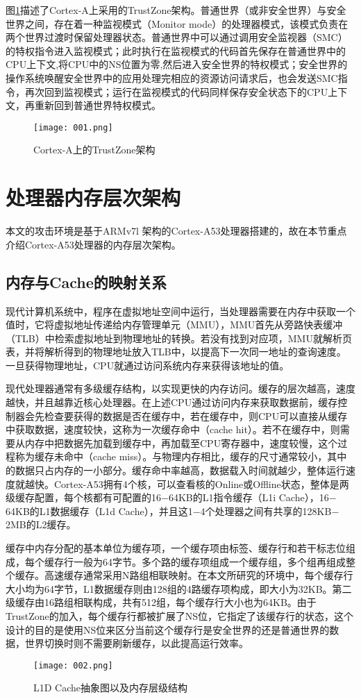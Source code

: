 图\ref{001}描述了Cortex-A上采用的TrustZone架构。普通世界（或非安全世界）与安全世界之间，存在着一种监视模式（Monitor  mode）的处理器模式，该模式负责在两个世界过渡时保留处理器状态。普通世界中可以通过调用安全监视器（SMC）的特权指令进入监视模式；此时执行在监视模式的代码首先保存在普通世界中的CPU上下文,将CPU中的NS位置为零,然后进入安全世界的特权模式；安全世界的操作系统唤醒安全世界中的应用处理完相应的资源访问请求后，也会发送SMC指令，再次回到监视模式；运行在监视模式的代码同样保存安全状态下的CPU上下文，再重新回到普通世界特权模式。

\begin{figure}[H]
	\centering
	\texttt{[image: 001.png]}
	\caption{Cortex-A上的TrustZone架构}
	\label{001}
\end{figure}

\section{处理器内存层次架构}
本文的攻击环境是基于ARMv7l 架构的Cortex-A53处理器搭建的，故在本节重点介绍Cortex-A53处理器的内存层次架构。
\subsection{内存与Cache的映射关系}
现代计算机系统中，程序在虚拟地址空间中运行，当处理器需要在内存中获取一个值时，它将虚拟地址传递给内存管理单元（MMU），MMU首先从旁路快表缓冲（TLB）中检索虚拟地址到物理地址的转换。若没有找到对应项，MMU就解析页表，并将解析得到的物理地址放入TLB中，以提高下一次同一地址的查询速度。一旦获得物理地址，CPU就通过访问系统内存来获得该地址的值。

现代处理器通常有多级缓存结构，以实现更快的内存访问。缓存的层次越高，速度越快，并且越靠近核心处理器。在上述CPU通过访问内存来获取数据前，缓存控制器会先检查要获得的数据是否在缓存中，若在缓存中，则CPU可以直接从缓存中获取数据，速度较快，这称为一次缓存命中（cache hit）。若不在缓存中，则需要从内存中把数据先加载到缓存中，再加载至CPU寄存器中，速度较慢，这个过程称为缓存未命中（cache miss）。与物理内存相比，缓存的尺寸通常较小，其中的数据只占内存的一小部分。缓存命中率越高，数据载入时间就越少，整体运行速度就越快。Cortex-A53拥有4个核，可以查看核的Online或Offline状态，整体是两级缓存配置，每个核都有可配置的16$-$64KB的L1指令缓存（L1i Cache），16$-$64KB的L1数据缓存（L1d Cache），并且这1$-$4个处理器之间有共享的128KB$-$2MB的L2缓存。

缓存中内存分配的基本单位为缓存项，一个缓存项由标签、缓存行和若干标志位组成，每个缓存行一般为64字节。多个路的缓存项组成一个缓存组，多个组再组成整个缓存。高速缓存通常采用N路组相联映射。在本文所研究的环境中，每个缓存行大小均为64字节，L1数据缓存则由128组的4路缓存项构成，即大小为32KB。第二级缓存由16路组相联构成，共有512组，每个缓存行大小也为64KB。由于TrustZone的加入，每个缓存行都被扩展了NS位，它指定了该缓存行的状态，这个设计的目的是使用NS位来区分当前这个缓存行是安全世界的还是普通世界的数据，世界切换时则不需要刷新缓存，以此提高运行效率。
\begin{figure}[H]
	\centering
	\texttt{[image: 002.png]}
	\caption{ L1D Cache抽象图以及内存层级结构}
	\label{002}
\end{figure}


